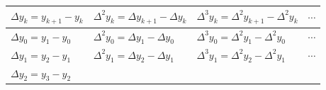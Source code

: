 \documentclass[]{book}
\begin{document}
\begin{longtable}[]{@{}llll@{}}
\toprule
\begin{minipage}[b]{0.22\columnwidth}\raggedright
\(\Delta y_k = y_{k+1} - y_k\)\strut
\end{minipage} & \begin{minipage}[b]{0.29\columnwidth}\raggedright
\(\Delta^2 y_k = \Delta y_{k+1} - \Delta y_k\)\strut
\end{minipage} & \begin{minipage}[b]{0.31\columnwidth}\raggedright
\(\Delta^3 y_k = \Delta^2 y_{k+1} - \Delta^2 y_k\)\strut
\end{minipage} & \begin{minipage}[b]{0.06\columnwidth}\raggedright
\(\cdots\)\strut
\end{minipage}\tabularnewline
\midrule
\endhead
\begin{minipage}[t]{0.22\columnwidth}\raggedright
\(\Delta y_0 = y_1 - y_0\)\strut
\end{minipage} & \begin{minipage}[t]{0.29\columnwidth}\raggedright
\(\Delta^2 y_0 = \Delta y_{1} - \Delta y_0\)\strut
\end{minipage} & \begin{minipage}[t]{0.31\columnwidth}\raggedright
\(\Delta^3 y_0 = \Delta^2 y_{1} - \Delta^2 y_0\)\strut
\end{minipage} & \begin{minipage}[t]{0.06\columnwidth}\raggedright
\(\cdots\)\strut
\end{minipage}\tabularnewline
\begin{minipage}[t]{0.22\columnwidth}\raggedright
\(\Delta y_1 = y_2 - y_1\)\strut
\end{minipage} & \begin{minipage}[t]{0.29\columnwidth}\raggedright
\(\Delta^2 y_1 = \Delta y_{2} - \Delta y_1\)\strut
\end{minipage} & \begin{minipage}[t]{0.31\columnwidth}\raggedright
\(\Delta^3 y_1 = \Delta^2 y_{2} - \Delta^2 y_1\)\strut
\end{minipage} & \begin{minipage}[t]{0.06\columnwidth}\raggedright
\(\cdots\)\strut
\end{minipage}\tabularnewline
\begin{minipage}[t]{0.22\columnwidth}\raggedright
\(\Delta y_2 = y_3 - y_2\)\strut
\end{minipage} & \begin{minipage}[t]{0.29\columnwidth}\raggedright

\end{minipage}
\end{longtable}
\end{document}
